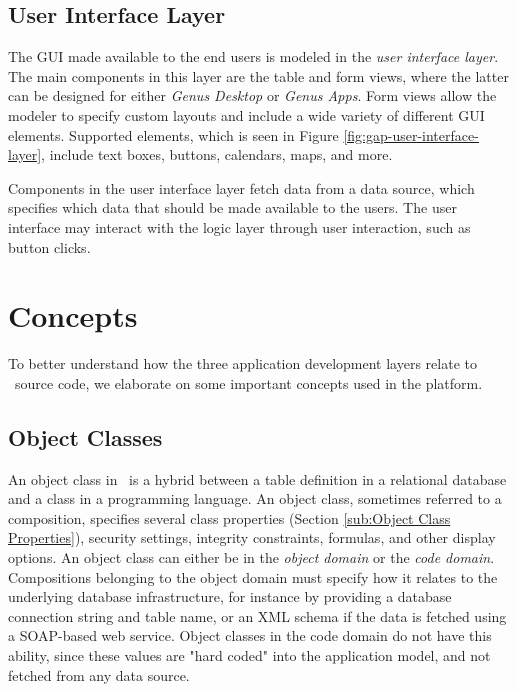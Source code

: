 \subsection{User Interface Layer}
\label{sub:User Interface Layer}

The GUI made available to the end users is modeled in the \textit{user interface layer}. The main components in this layer are the table and form views, where the latter can be designed for either \textit{Genus Desktop} or \textit{Genus Apps}. Form views allow the modeler to specify custom layouts and include a wide variety of different GUI elements. Supported elements, which is seen in Figure \ref{fig:gap-user-interface-layer}, include text boxes, buttons, calendars, maps, and more.

Components in the user interface layer fetch data from a data source, which specifies which data that should be made available to the users. The user interface may interact with the logic layer through user interaction, such as button clicks.

\section{Concepts}
\label{sec:Concepts}
To better understand how the three application development layers relate to \gap~source code, we elaborate on some important concepts used in the platform.

\subsection{Object Classes}
\label{sub:Object Classes}
An object class in \gap~is a hybrid between a table definition in a relational database and a class in a programming language. An object class, sometimes referred to a composition, specifies several class properties (Section \ref{sub:Object Class Properties}), security settings, integrity constraints, formulas, and other display options. An object class can either be in the \textit{object domain} or the \textit{code domain}. Compositions belonging to the object domain must specify how it relates to the underlying database infrastructure, for instance by providing a database connection string and table name, or an XML schema if the data is fetched using a SOAP-based web service. Object classes in the code domain do not have this ability, since these values are "hard coded" into the application model, and not fetched from any data source.

